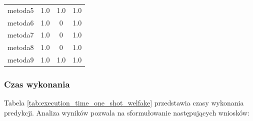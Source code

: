 \begin{table}[H]
\begin{tabular}{lccc}
		metoda5           & 1.0           & 1.0              & 1.0            \\
		metoda6           & 1.0           &   0              & 1.0            \\
		metoda7           & 1.0           &   0              & 1.0            \\
		metoda8           & 1.0           &   0              & 1.0            \\
		metoda9           & 1.0           & 1.0              & 1.0            \\
		\bottomrule
	\end{tabular}
\end{table}

\subsubsection{Czas wykonania}
Tabela \ref{tab:execution_time_one_shot_welfake} przedstawia czasy wykonania predykcji. Analiza wyników pozwala na sformułowanie następujących wniosków:

